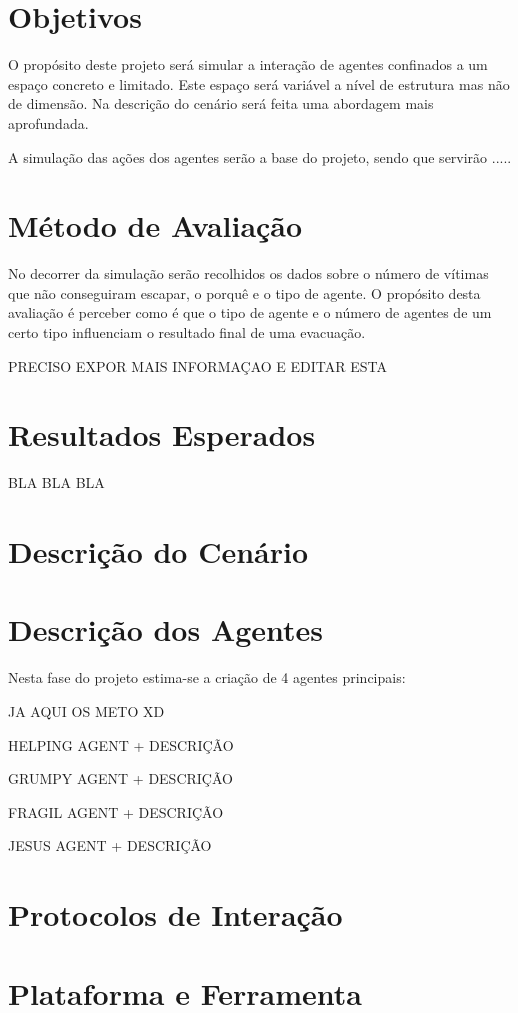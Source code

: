 \documentclass[a4paper,11pt]{article}
\begin{document}
\section{Objetivos}
O propósito deste projeto será simular a interação de agentes confinados a um espaço concreto e limitado. Este espaço será variável a nível de estrutura mas não de dimensão. Na descrição do cenário será feita uma abordagem mais aprofundada.

A simulação das ações dos agentes serão a base do projeto, sendo que servirão .....

\section{Método de Avaliação}
No decorrer da simulação serão recolhidos os dados sobre o número de vítimas que não conseguiram escapar, o porquê e o tipo de agente. O propósito desta avaliação é perceber como é que o tipo de agente e o número de agentes de um certo tipo influenciam o resultado final de uma evacuação. 

PRECISO EXPOR MAIS INFORMAÇAO E EDITAR ESTA

\section{Resultados Esperados}
BLA BLA BLA


\section{Descrição do Cenário}

\section{Descrição dos Agentes}
Nesta fase do projeto estima-se a criação de 4 agentes principais:

JA AQUI OS METO XD

HELPING AGENT + DESCRIÇÃO

GRUMPY AGENT + DESCRIÇÃO

FRAGIL AGENT + DESCRIÇÃO

JESUS AGENT + DESCRIÇÃO


\section{Protocolos de Interação}

\section{Plataforma e Ferramenta}  
\end{document}
